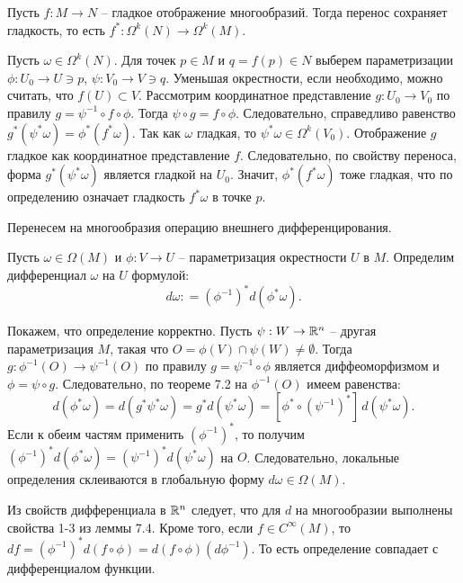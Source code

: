 \begin{lemma}
	Пусть $f : M \to N$ -- гладкое отображение многообразий. Тогда перенос сохраняет гладкость, то есть $f^* : \Omega^k(N) \to \Omega^k(M)$. 
\end{lemma}

\begin{myproof}
	Пусть $\omega \in \Omega^k(N)$. 
	Для точек $p \in M$ и $q = f(p) \in N$ выберем параметризации $\phi : U_0 \to U \ni p$, $\psi : V_0 \to V \ni q$. 
	Уменьшая окрестности, если необходимо, можно считать, что $f(U) \subset V$. 
	Рассмотрим координатное представление $g : U_0 \to V_0$ по правилу $g = \psi^{-1} \circ f \circ \phi$. Тогда $\psi \circ g = f \circ \phi$. 
	Следовательно, справедливо равенство 
	$g^* (\psi^* \omega) = \phi^* (f^* \omega)$. 
	Так как $\omega$ гладкая, то $\psi^* \omega \in \Omega^k(V_0)$. Отображение $g$ гладкое как координатное представление $f$. Следовательно, по свойству переноса, форма $g^* (\psi^* \omega)$ является гладкой на $U_0$.
	Значит, $\phi^* (f^* \omega)$ тоже гладкая, что по определению означает гладкость $f^* \omega$ в точке $p$.
\end{myproof}

\vspace{5pt}
Перенесем на многообразия операцию внешнего дифференцирования.

\begin{definition}
	Пусть $\omega \in \Omega(M)$ и $\phi : V \to U$ -- параметризация окрестности $U$ в $M$. 
	Определим дифференциал $\omega$ на $U$ формулой:
	\[ d \omega : =  (\phi^{-1})^* d (\phi^* \omega). \]
\end{definition}

\begin{note}
	Покажем, что определение корректно.
	Пусть $\psi : W \to \mathbb{R}^n$ -- другая параметризация $M$, такая что $O = \phi(V) \cap \psi(W) \neq \emptyset$. 
	Тогда $g : \phi^{-1}(O) \to \psi^{-1}(O)$ по правилу $g = \psi^{-1} \circ \phi$ является диффеоморфизмом и $\phi = \psi \circ g$. 
	Следовательно, по теореме 7.2 на $\phi^{-1}(O)$ имеем равенства:
	\[ d(\phi^* \omega) = d(g^* \psi^* \omega) = g^* d(\psi^* \omega) = [\phi^* \circ (\psi^{-1})^*] \, d(\psi^* \omega). \] 
	Если к обеим частям применить $(\phi^{-1})^*$, то получим $(\phi^{-1})^* d (\phi^* \omega) = (\psi^{-1})^* d(\psi^* \omega)$ на $O$. 
	Следовательно, локальные определения склеиваются в глобальную форму $d \omega \in \Omega(M)$.
\end{note}

\begin{note}
	Из свойств дифференциала в $\mathbb{R}^n$ следует, что для $d$ на многообразии выполнены свойства 1-3 из леммы 7.4.
	Кроме того, если $f \in C^{\infty}(M)$, то $df = (\phi^{-1})^* d (f \circ \phi) = d(f \circ \phi)(d \phi^{-1})$.
	То есть определение совпадает с дифференциалом функции.
\end{note}

